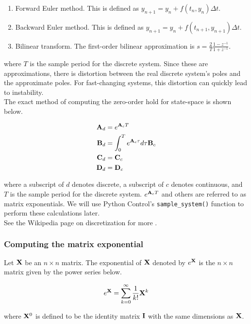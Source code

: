 \begin{enumerate}
  \item Forward Euler method. This is defined as
    $y_{n+1} = y_n + f(t_n, y_n) \Delta t$.
  \item Backward Euler method. This is defined as
    $y_{n+1} = y_n + f(t_{n+1}, y_{n+1}) \Delta t$.
  \item Bilinear transform. The first-order bilinear approximation is
    $s = \frac{2}{T} \frac{1 - z^{-1}}{1 + z^{-1}}$.
\end{enumerate}

where $T$ is the sample period for the discrete system. Since these are
approximations, there is distortion between the real discrete system's poles and
the approximate poles. For fast-changing systems, this distortion can quickly
lead to instability. \\

The exact method of computing the zero-order hold for state-space is shown
below.

\begin{align}
  \mathbf{A}_d &= e^{\mathbf{A}_c T} \\
  \mathbf{B}_d &= \int_0^T e^{\mathbf{A}_c \tau} d\tau \mathbf{B}_c \\
  \mathbf{C}_d &= \mathbf{C}_c \\
  \mathbf{D}_d &= \mathbf{D}_c
\end{align}

where a subscript of $d$ denotes discrete, a subscript of $c$ denotes
continuous, and $T$ is the sample period for the discrete system.
$e^{\mathbf{A}_c T}$ and others are referred to as matrix exponentials. We will use
Python Control's \texttt{sample\_system()} function to perform these
calculations later. \\

See the Wikipedia page on discretization for more \cite{bib:discretization}.

\subsubsection{Computing the matrix exponential}

Let $\mathbf{X}$ be an $n \times n$ matrix. The exponential of $\mathbf{X}$ denoted by
$e^{\mathbf{X}}$ is the $n \times n$ matrix given by the power series below.

\begin{equation}
  e^{\mathbf{X}} = \sum_{k=0}^\infty \frac{1}{k!} \mathbf{X}^k
\end{equation}

where $\mathbf{X}^0$ is defined to be the identity matrix $\mathbf{I}$ with the same
dimensions as $\mathbf{X}$.
